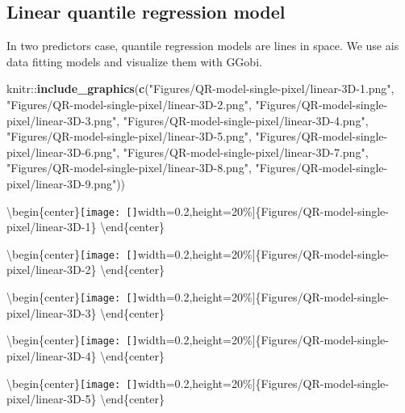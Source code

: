 \documentclass[11pt,a4paper,]{article}
\newenvironment{Shaded}{\begin{snugshade}}{\end{snugshade}}
\newcommand{\KeywordTok}[1]{\textcolor[rgb]{0.13,0.29,0.53}{\textbf{{#1}}}}
\newcommand{\StringTok}[1]{\textcolor[rgb]{0.31,0.60,0.02}{{#1}}}
\newcommand{\NormalTok}[1]{{#1}}
\theoremstyle{definition}
\theoremstyle{definition}
\theoremstyle{remark}
\begin{document}
\subsection{Linear quantile regression
model}\label{linear-quantile-regression-model}

In two predictors case, quantile regression models are lines in space.
We use ais data fitting models and visualize them with GGobi.

\begin{Shaded}
\begin{Highlighting}[]
\NormalTok{knitr::}\KeywordTok{include_graphics}\NormalTok{(}\KeywordTok{c}\NormalTok{(}\StringTok{"Figures/QR-model-single-pixel/linear-3D-1.png"}\NormalTok{,}
                          \StringTok{"Figures/QR-model-single-pixel/linear-3D-2.png"}\NormalTok{,}
                          \StringTok{"Figures/QR-model-single-pixel/linear-3D-3.png"}\NormalTok{,}
                          \StringTok{"Figures/QR-model-single-pixel/linear-3D-4.png"}\NormalTok{,}
                          \StringTok{"Figures/QR-model-single-pixel/linear-3D-5.png"}\NormalTok{,}
                          \StringTok{"Figures/QR-model-single-pixel/linear-3D-6.png"}\NormalTok{,}
                          \StringTok{"Figures/QR-model-single-pixel/linear-3D-7.png"}\NormalTok{,}
                          \StringTok{"Figures/QR-model-single-pixel/linear-3D-8.png"}\NormalTok{,}
                          \StringTok{"Figures/QR-model-single-pixel/linear-3D-9.png"}\NormalTok{))}
\end{Highlighting}
\end{Shaded}

\textbackslash{}begin\{center\}\texttt{[image: []}width=0.2\linewidth,height=20\%{]}\{Figures/QR-model-single-pixel/linear-3D-1\}
\textbackslash{}end\{center\}

\textbackslash{}begin\{center\}\texttt{[image: []}width=0.2\linewidth,height=20\%{]}\{Figures/QR-model-single-pixel/linear-3D-2\}
\textbackslash{}end\{center\}

\textbackslash{}begin\{center\}\texttt{[image: []}width=0.2\linewidth,height=20\%{]}\{Figures/QR-model-single-pixel/linear-3D-3\}
\textbackslash{}end\{center\}

\textbackslash{}begin\{center\}\texttt{[image: []}width=0.2\linewidth,height=20\%{]}\{Figures/QR-model-single-pixel/linear-3D-4\}
\textbackslash{}end\{center\}

\textbackslash{}begin\{center\}\texttt{[image: []}width=0.2\linewidth,height=20\%{]}\{Figures/QR-model-single-pixel/linear-3D-5\}
\textbackslash{}end\{center\}
\end{document}
